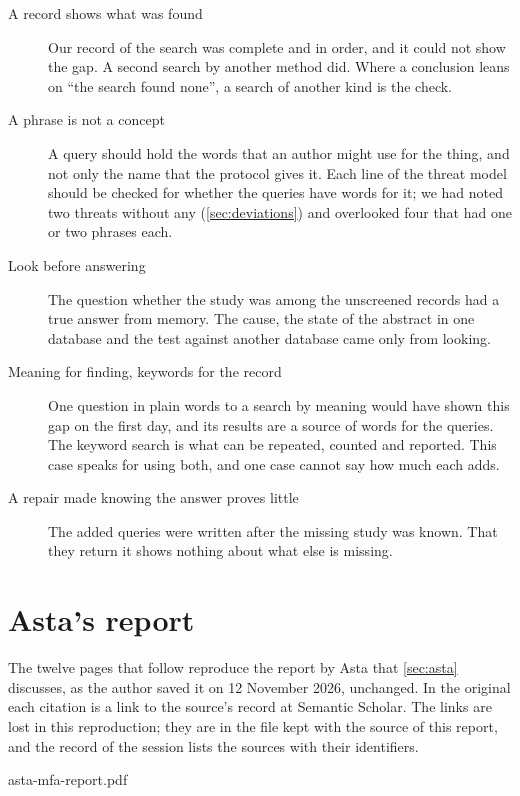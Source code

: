\begin{description}
  \item[A record shows what was found] Our record of the search was
    complete and in order, and it could not show the gap.
    A second search by another method did.
    Where a conclusion leans on \enquote{the search found none}, a
    search of another kind is the check.
  \item[A phrase is not a concept] A query should hold the words that
    an author might use for the thing, and not only the name that the
    protocol gives it.
    Each line of the threat model should be checked for whether the
    queries have words for it; we had noted two threats without any
    (\cref{sec:deviations}) and overlooked four that had one or two
    phrases each.
  \item[Look before answering] The question whether the study was
    among the unscreened records had a true answer from memory.
    The cause, the state of the abstract in one database and the test
    against another database came only from looking.
  \item[Meaning for finding, keywords for the record] One question in
    plain words to a search by meaning would have shown this gap on the
    first day, and its results are a source of words for the queries.
    The keyword search is what can be repeated, counted and reported.
    This case speaks for using both, and one case cannot say how much
    each adds.
  \item[A repair made knowing the answer proves little] The added
    queries were written after the missing study was known.
    That they return it shows nothing about what else is missing.
\end{description}


\section{Asta's report}\label{sec:asta-report}

The twelve pages that follow reproduce the report by Asta that
\cref{sec:asta} discusses, as the author saved it on 12 November 2026,
unchanged.
In the original each citation is a link to the source's record at
Semantic Scholar.
The links are lost in this reproduction; they are in the file kept with
the source of this report, and the record of the session lists the
sources with their identifiers.

%
  {asta-mfa-report.pdf}
